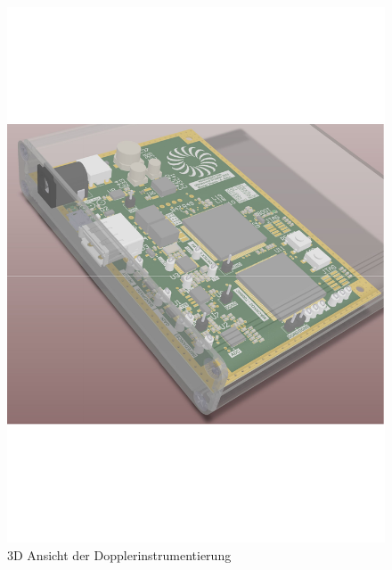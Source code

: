 \begin{figure}[!h]
	\centering
   	\includegraphics[width=\textwidth, trim= 5mm 65mm 0mm 65mm, clip=true]{images/pcb/Job2.PDF}%
    \caption{3D Ansicht der Dopplerinstrumentierung}
    \label{fig:3Dpcb}
\end{figure}
\newpage
